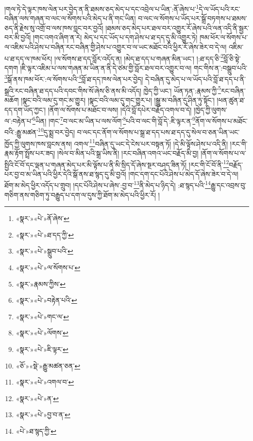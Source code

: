 །གལ་ཏེ་དེ་ལྟར་ཁས་ལེན་པར་བྱེད་ན་ནི་ཐམས་ཅད་མེད་པ་དང་འབྲེལ་པ་ཡིན་:ནོ་ཞེས་པ་\footnote{«སྣར་»«པེ་»ནོ་ཞེས་}དེ་ལ་ཡོད་པའི་རང་བཞིན་ལས་གཞན་བ་ལང་ལ་སོགས་པའི་མེད་པ་ནི་གང་ཡིན། བ་ལང་ལ་སོགས་པ་ཡོད་པར་སྒྲོ་བཏགས་པ་ཐམས་ཅད་ནི་རྗེས་སུ་འགྲོ་བ་ལས་ཁས་བླང་བར་བྱའོ། །ཐམས་ཅད་མེད་པར་ཐལ་བར་འགྱུར་རོ་ཞེས་པའི་ལན་འདི་ནི་སྦྱར་བར་མི་བྱའོ། །གང་འགའ་ཞིག་ན་རེ། མེད་པ་དང་ཡོད་པ་དག་ཤེས་པ་ཐ་དད་དུ་མི་འགྱུར་ཏེ། ཁམ་ཕོར་ལ་སོགས་པ་ལ་འཇིམ་པའི་ཤེས་པ་བཞིན་རང་བཞིན་གྱི་ཤེས་པ་འགྱུར་བ་ལ་ཡང་མཐོང་བའི་ཕྱིར་རོ་ཞེས་ཟེར་བ་དེ་ལ། འཇིམ་པ་ཐ་དད་ལ་ཁམ་ཕོར། །ལ་སོགས་ཐ་དད་བློར་འདོད་ན། །མེད་ཐ་དད་པ་གཞན་མིན་ཡང་། །:ཐ་དད་ཅི་\footnote{«སྣར་»«པེ་»ཐ་དད་ཀྱི་}བློ་ཅི་སྟེ་དགག །ཇི་ལྟར་འཇིམ་པ་ལས་གཞན་མ་ཡིན་ན་ནི་དེ་ཙམ་གྱི་བློར་ཐལ་བར་འགྱུར་བ་ལ། གང་གིས་ན་:བསྒྲུབ་པའི་\footnote{«སྣར་»«པེ་»སྒྲུབ་པའི་}སྒོ་ནས་ཁམ་ཕོར་:ལ་སོགས་པའི་\footnote{«སྣར་»«པེ་»ལ་སོགས་པ་}བློ་ཐ་དད་ཁས་ལེན་པར་བྱེད། དེ་བཞིན་དུ་མེད་པ་ལ་ཡོད་པའི་བློ་ཐ་དད་པ་ནི་སྒྲའི་རང་བཞིན་ཐ་དད་པའི་དབང་གིས་སོ་ཞེས་ཅི་ནས་མི་འདོད། ཁྱེད་ཀྱི་ཡང་། ཡོན་ཏན་:རྣམས་ཀྱི་\footnote{«སྣར་»རྣམས་ཀྱིས་}རང་བཞིན་མཆོག །སྣང་བའི་ལམ་དུ་གང་མ་གྱུར། །སྣང་བའི་ལམ་དུ་གང་གྱུར་པ། །སྒྱུ་མ་བཞིན་དུ་ཤིན་ཏུ་སྟོང་། །ཕན་ཚུན་ཐ་དད་དག་ཡོད་ཀྱང་། །ནོག་ལ་སོགས་པ་མཐོང་བ་ལས། །དེའི་བློ་དཔེར་བརྗོད་འགལ་བ་དེ། །ཁྱེད་ཀྱི་ལུགས་ལ་:བརྟེན་པ་\footnote{«སྣར་»«པེ་»བརྟེན་པའི་}ཡིན། །གང་\footnote{«སྣར་»«པེ་»གང་ལ་}བ་ལང་མ་ཡིན་པ་ལས་ལོག་\footnote{«སྣར་»«པེ་»ལོགས་}པའི་བ་ལང་གི་བློ་དེ་:ཇི་ལྟར་ན་\footnote{«སྣར་»«པེ་»ཇི་ལྟར་}ནོག་ལ་སོགས་པ་མཐོང་བའི་:རྒྱུ་མཚན་\footnote{«ཅོ་»«སྡེ་»རྒྱུ་མཚན་ཅན་}དུ་སྨྲ་བར་བྱེད། བ་ལང་དང་ནོག་ལ་སོགས་པ་སྒྲ་ཐ་དད་པས་ཐ་དད་དུ་སེལ་བ་ཅན་ཡིན་ཡང་ཁྱོད་ཀྱི་ལུགས་ཁས་བླངས་ནས། འགལ་\footnote{«སྣར་»«པེ་»འགལ་བ་}བཞིན་དུ་ཡང་དེ་ངེས་པར་བསྟན་ཏོ། །དེ་མི་ལྟོས་ཤེས་པ་འདི་ནི། །རང་གི་རྣམ་རྟོག་སྤྲོས་པར་ཟད། །སེལ་བ་མིན་པའི་སྒྲ་ཡིས་ནི། །རང་བཞིན་འགའ་ཡང་བརྗོད་མི་བྱ། །ནོག་ལ་སོགས་པ་ལ་སྤྱིའི་ངོ་བོ་དང་ལྡན་པ་གཞན་མེད་པར་མི་ལྟོས་པ་ནི་མི་སྲིད་དོ་ཞེས་སྔར་བཤད་ཟིན་ཏོ། །རང་གི་ངོ་བོ་ནི་\footnote{«སྣར་»«པེ་»ན་}བརྗོད་པར་བྱ་བ་མ་ཡིན་པའི་ཕྱིར་དེའི་སྒོ་ནས་ཐ་སྙད་དུ་མི་བྱའོ། །གང་དག་དང་པོའི་ཤེས་པ་མེད་དོ་ཞེས་ཟེར་བ་དེ་ལ། ཐོག་མ་མེད་ཕྱིར་འདོད་པ་གྲུབ། །དང་པོའི་ཤེས་པ་ཞེས་:བྱ་བ་\footnote{«སྣར་»«པེ་»བྱ་བ་ན་}ནི་མེད་པ་ཉིད་དེ། :ཐ་སྙད་པའི་\footnote{«པེ་»ཐ་སྙད་ཀྱི་}རྒྱུ་དང་འབྲས་བུ་གཅིག་ནས་གཅིག་ཏུ་བརྒྱུད་པ་དག་ལ་དུས་ཀྱི་ཐོག་མ་མེད་པའི་ཕྱིར་རོ། །
